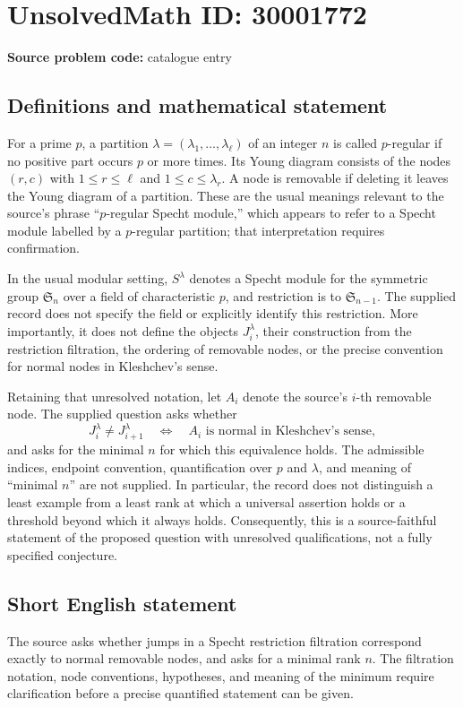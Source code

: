 \documentclass[11pt]{article}
\begin{document}
\section*{UnsolvedMath ID: 30001772}
\textbf{Source problem code:} catalogue entry
\subsection{Definitions and mathematical statement}
For a prime \(p\), a partition \(\lambda=(\lambda_1,\ldots,\lambda_\ell)\) of an integer \(n\) is called \(p\)-regular if no positive part occurs \(p\) or more times. Its Young diagram consists of the nodes \((r,c)\) with \(1\le r\le\ell\) and \(1\le c\le\lambda_r\). A node is removable if deleting it leaves the Young diagram of a partition. These are the usual meanings relevant to the source's phrase ``\(p\)-regular Specht module,'' which appears to refer to a Specht module labelled by a \(p\)-regular partition; that interpretation requires confirmation.

In the usual modular setting, \(S^\lambda\) denotes a Specht module for the symmetric group \(\mathfrak S_n\) over a field of characteristic \(p\), and restriction is to \(\mathfrak S_{n-1}\). The supplied record does not specify the field or explicitly identify this restriction. More importantly, it does not define the objects \(J_i^\lambda\), their construction from the restriction filtration, the ordering of removable nodes, or the precise convention for normal nodes in Kleshchev's sense.

Retaining that unresolved notation, let \(A_i\) denote the source's \(i\)-th removable node. The supplied question asks whether
\[
J_i^\lambda\ne J_{i+1}^\lambda
\quad\Longleftrightarrow\quad
A_i\text{ is normal in Kleshchev's sense},
\]
and asks for the minimal \(n\) for which this equivalence holds. The admissible indices, endpoint convention, quantification over \(p\) and \(\lambda\), and meaning of ``minimal \(n\)'' are not supplied. In particular, the record does not distinguish a least example from a least rank at which a universal assertion holds or a threshold beyond which it always holds. Consequently, this is a source-faithful statement of the proposed question with unresolved qualifications, not a fully specified conjecture.
\subsection{Short English statement}
The source asks whether jumps in a Specht restriction filtration correspond exactly to normal removable nodes, and asks for a minimal rank \(n\). The filtration notation, node conventions, hypotheses, and meaning of the minimum require clarification before a precise quantified statement can be given.
\end{document}
